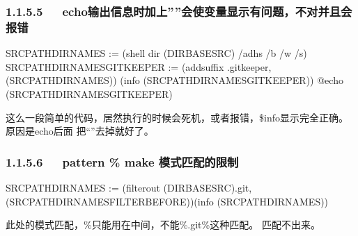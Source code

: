 \documentclass[letterpaper,12pt,english]{sphinxmanual}
\begin{document}
\subsubsection{1.1.5.5   echo输出信息时加上””会使变量显示有问题，不对并且会报错}
\label{\detokenize{001software/001install/make:echo}}
\begin{sphinxVerbatim}[commandchars=\\\{\}]
SRC\PYGZus{}PATHDIRNAMES := \PYGZdl{}(shell dir \PYGZdl{}(DIR\PYGZus{}BASE\PYGZus{}SRC) /ad\PYGZhy{}h\PYGZhy{}s /b /w /s)
SRC\PYGZus{}PATHDIRNAMES\PYGZus{}GITKEEPER := \PYGZdl{}(addsuffix \PYGZbs{}.gitkeeper,\PYGZdl{}(SRC\PYGZus{}PATHDIRNAMES))
\PYGZdl{}(info \PYGZdl{}(SRC\PYGZus{}PATHDIRNAMES\PYGZus{}GITKEEPER))
@echo \PYGZdq{}\PYGZdl{}(SRC\PYGZus{}PATHDIRNAMES\PYGZus{}GITKEEPER)\PYGZdq{}
\end{sphinxVerbatim}

这么一段简单的代码，居然执行的时候会死机，或者报错，\$info显示完全正确。 原因是echo后面 把“”去掉就好了。


\subsubsection{1.1.5.6   pattern \% make 模式匹配的限制}
\label{\detokenize{001software/001install/make:pattern-make}}
\begin{sphinxVerbatim}[commandchars=\\\{\}]
SRC\PYGZus{}PATHDIRNAMES := \PYGZdl{}(filter\PYGZhy{}out \PYGZdl{}(DIR\PYGZus{}BASE\PYGZus{}SRC)\PYGZbs{}.git\PYGZpc{},\PYGZdl{}(SRC\PYGZus{}PATHDIRNAMES\PYGZus{}FILTER\PYGZus{}BEFORE))\PYGZdl{}(info \PYGZdl{}(SRC\PYGZus{}PATHDIRNAMES))
\end{sphinxVerbatim}

此处的模式匹配，\%只能用在中间，不能\%.git\%这种匹配。 匹配不出来。
\end{document}
